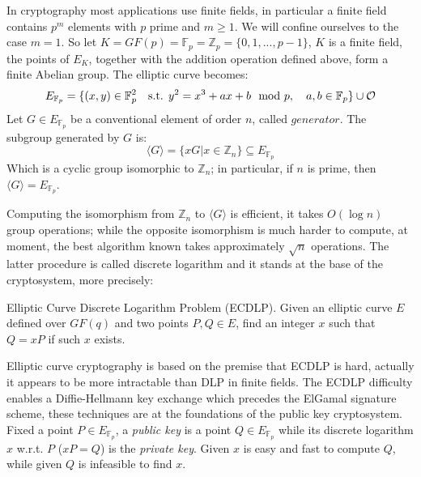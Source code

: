 In cryptography most applications use finite fields, in particular a finite field contains $p^m$ elements with $p$ prime and $m \geq 1$. We will confine ourselves to the case $m=1$. So let $K=GF(p)=\mathbb{F}_p =\mathbb{Z}_p  = \{0, 1, ..., p-1\}$, $K$ is a finite field, the points of $E_K$, together with the addition operation defined above, form a finite Abelian group. The elliptic curve becomes:
\begin{equation}
E_{\mathbb{F}_p}=\{(x,y)\in \mathbb{F}_p^2 \quad \textmd{s.t. }
y^2 = x^3 + ax + b \mod p, \quad a,b \in \mathbb{F}_p \} \cup \mathcal{O}
\end{equation}
Let $G \in E_{\mathbb{F}_p}$ be a conventional element of order $n$, called $generator$. The subgroup generated by $G$ is:
\begin{equation}
	\langle G \rangle = \{xG|x \in \mathbb{Z}_n\} \subseteq E_{\mathbb{F}_p}
\end{equation}
Which is a cyclic group isomorphic to $\mathbb{Z}_n$; in particular, if $n$ is prime, then $\langle G \rangle = E_{\mathbb{F}_p}$.

Computing the isomorphism from $\mathbb{Z}_n$ to $\langle G \rangle$ is efficient, it takes $O(\log n)$ group operations; while the opposite isomorphism is much harder to compute, at moment, the best algorithm known takes approximately $\sqrt{n}$ operations. The latter procedure is called discrete logarithm and it stands at the base of the cryptosystem, more precisely:
\begin{mydef}
	Elliptic Curve Discrete Logarithm Problem (ECDLP). Given an elliptic curve $E$ defined over $GF(q)$ and two points $P, Q \in E$, find an integer $x$ such that $Q = xP$ if such $x$ exists.
\end{mydef}
Elliptic curve cryptography is based on the premise that ECDLP is hard, actually it appears to be more intractable than DLP in finite fields.
The ECDLP difficulty enables a Diffie-Hellmann key exchange which precedes the ElGamal signature scheme, these techniques are at the foundations of the public key cryptosystem.
Fixed a point $P \in E_{\mathbb{F}_p}$, a \textit{public key} is a point $Q \in E_{\mathbb{F}_p}$ while its discrete logarithm $x$ w.r.t. $P$ ($xP=Q$) is the \textit{private key}.
Given $x$ is easy and fast to compute $Q$, while given $Q$ is infeasible to find $x$.

